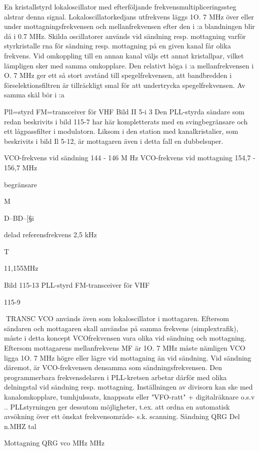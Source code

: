 \documentclass[a4paper,twoside,twocolumn,openright]{book}
\begin{document}
{{{En kristallstyrd lokaloscillator med efterföljande frekvensmultipliceringssteg alstrar
denna signal.
Lokaloscillatorkedjans utfrekvens läggs
1O. 7 MHz över eller under mottagningsfrekvensen och mellanfrekvensen efter den i :a
blandningen blir då i 0.7 MHz. Skilda oscillatorer används vid sändning resp. mottagning varför styrkristalle rna för sändning resp.
mottagning på en given kanal får olika frekvens. Vid omkoppling till en annan kanal
väljs ett annat kristallpar, vilket lämpligen
sker med samma omkopplare.
Den relativt höga i :a mellanfrekvensen
i O. 7 MHz ger ett så stort avstånd till spegelfrekvensen, att bandbredden i förselektionsfiltren är tillräckligt smal för att undertrycka
spegelfrekvensen. Av samma skäl bör i :a

Pll=styrd FM=transceiver för VHF
Bild II 5-i 3
Den PLL-styrda sändare som redan beskrivits i bild 115-7 har här kompletterats med en
svingbegränsare och ett lågpassfilter i modulatorn. Liksom i den station med kanalkristalier, som beskrivits i bild Il 5-12, är mottagaren även i detta fall en dubbelsuper.

VCO-frekvens vid sändning
144 - 146 M Hz
VCO-frekvens vid mottagning 154,7 - 156,7 MHz

begränsare

M

D--{BD--[§}i~

delad
referensfrekvens 2,5 kHz

T

11,155MHz

Bild 115-13 PLL-styrd FM-transceiver för VHF

115-9

TRANSC
VCO används även som lokaloscillator i
mottagaren. Eftersom sändaren och mottagaren skall användas på samma frekvens
(simplextrafik), måste i detta koncept VCOfrekvensen vara olika vid sändning och mottagning. Eftersom mottagarens mellanfrekvens MF är 1O. 7 MHz måste nämligen VCO
ligga 1O. 7 MHz högre eller lägre vid mottagning än vid sändning. Vid sändning däremot, är VCO-frekvensen densamma som
sändningsfrekvensen.
Den programmerbara frekvensdelaren i
PLL-kretsen arbetar därför med olika delningstal vid sändning resp. mottagning. Inställningen av divisorn kan ske med kanalomkopplare, tumhjulssats, knappsats eller
"VFO-ratt" + digitalräknare o.s.v .. PLLstyrningen ger dessutom möjligheter, t.ex.
att ordna en automatisk avsökning över ett
önskat frekvensområde- s.k. scanning.
Sändning
QRG
Del n.MHZ
tal

Mottagning
QRG
vco
MHz
MHz

}}}
\end{document}
